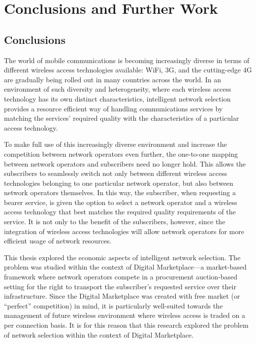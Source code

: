 \chapter{Conclusions and Further Work}
\label{cha:conclusions}

\section{Conclusions} %
\label{sec:conclusions_conclusions}
The world of mobile communications is becoming increasingly diverse in terms of different wireless access technologies available: WiFi, 3G, and the cutting-edge 4G are gradually being rolled out in many countries across the world. In an environment of such diversity and heterogeneity, where each wireless access technology has its own distinct characteristics, intelligent network selection provides a resource efficient way of handling communications services by matching the services' required quality with the characteristics of a particular access technology.

To make full use of this increasingly diverse environment and increase the competition between network operators even further, the one-to-one mapping between network operators and subscribers need no longer hold. This allows the subscribers to seamlessly switch not only between different wireless access technologies belonging to one particular network operator, but also between network operators themselves. In this way, the subscriber, when requesting a bearer service, is given the option to select a network operator and a wireless access technology that best matches the required quality requirements of the service. It is not only to the benefit of the subscribers, however, since the integration of wireless access technologies will allow network operators for more efficient usage of network resources.

This thesis explored the economic aspects of intelligent network selection. The problem was studied within the context of Digital Marketplace---a market-based framework where network operators compete in a procurement auction-based setting for the right to transport the subscriber's requested service over their infrastructure. Since the Digital Marketplace was created with free market (or ``perfect'' competition) in mind, it is particularly well-suited towards the management of future wireless environment where wireless access is traded on a per connection basis. It is for this reason that this research explored the problem of network selection within the context of Digital Marketplace.

